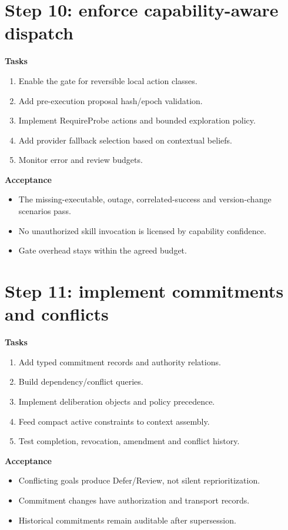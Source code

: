 \documentclass[11pt,oneside]{report}
\begin{document}
\section{Step 10: enforce capability-aware dispatch}

\textbf{Tasks}
\begin{enumerate}
  \item Enable the gate for reversible local action classes.
  \item Add pre-execution proposal hash/epoch validation.
  \item Implement RequireProbe actions and bounded exploration policy.
  \item Add provider fallback selection based on contextual beliefs.
  \item Monitor error and review budgets.
\end{enumerate}

\textbf{Acceptance}
\begin{itemize}
  \item The missing-executable, outage, correlated-success and version-change scenarios pass.
  \item No unauthorized skill invocation is licensed by capability confidence.
  \item Gate overhead stays within the agreed budget.
\end{itemize}

\section{Step 11: implement commitments and conflicts}

\textbf{Tasks}
\begin{enumerate}
  \item Add typed commitment records and authority relations.
  \item Build dependency/conflict queries.
  \item Implement deliberation objects and policy precedence.
  \item Feed compact active constraints to context assembly.
  \item Test completion, revocation, amendment and conflict history.
\end{enumerate}

\textbf{Acceptance}
\begin{itemize}
  \item Conflicting goals produce Defer/Review, not silent reprioritization.
  \item Commitment changes have authorization and transport records.
  \item Historical commitments remain auditable after supersession.
\end{itemize}
\end{document}
